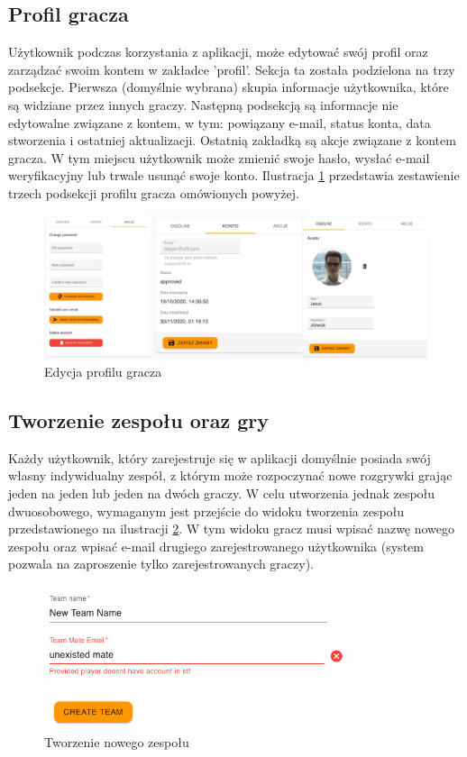 \subsection{Profil gracza}
Użytkownik podczas korzystania z aplikacji, może edytować swój profil oraz zarządzać swoim kontem w zakładce 'profil'. Sekcja ta została podzielona na trzy podsekcje. Pierwsza (domyślnie wybrana) skupia informacje użytkownika, które są widziane przez innych graczy. Następną podsekcją są informacje nie edytowalne związane z kontem, w tym: powiązany e-mail, status konta, data stworzenia i ostatniej aktualizacji. Ostatnią zakładką są akcje związane z kontem gracza. W tym miejscu użytkownik może zmienić swoje hasło, wysłać e-mail weryfikacyjny lub trwale usunąć swoje konto. Ilustracja \ref{fig:userProfile} przedstawia zestawienie trzech podsekcji profilu gracza omówionych powyżej.

\begin{figure}[h!]
  \centering
    \includegraphics[width=\textwidth]{images/player/userProfie.jpeg}
  \caption{Edycja profilu gracza}
  \label{fig:userProfile}
\end{figure}

\subsection{Tworzenie zespołu oraz gry}
Każdy użytkownik, który zarejestruje się w aplikacji domyślnie posiada swój własny indywidualny zespół, z którym może rozpoczynać nowe rozgrywki grając jeden na jeden lub jeden na dwóch graczy. W celu utworzenia jednak zespołu dwuosobowego, wymaganym jest przejście do widoku tworzenia zespołu przedstawionego na ilustracji \ref{fig:creating-team}. W tym widoku gracz musi wpisać nazwę nowego zespołu oraz wpisać e-mail drugiego zarejestrowanego użytkownika (system pozwala na zaproszenie tylko zarejestrowanych graczy).

\begin{figure}[h!]
  \centering
    \includegraphics[width=0.8\textwidth]{images/player/creating-team.png}
  \caption{Tworzenie nowego zespołu}
  \label{fig:creating-team}
\end{figure}

